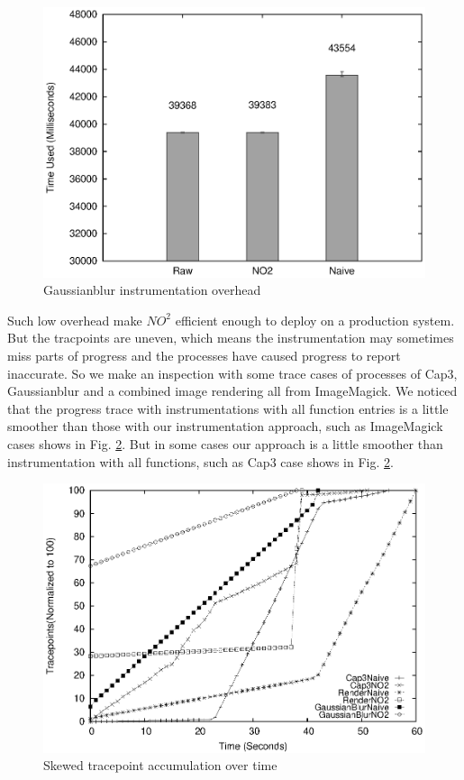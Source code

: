 \begin{figure}
\centering
  \includegraphics[width=0.9\columnwidth]{figures/overhead_gaussianblur.eps}
\caption{Gaussianblur instrumentation overhead}
\label{figure:overhead_gaussianblur}
\end{figure}

Such low overhead make $NO^2$ efficient enough to deploy on a production system. But
the tracpoints are uneven, which means the instrumentation may sometimes miss parts of progress and
the processes have caused progress to report inaccurate. So we make an inspection
with some trace cases of processes of Cap3, Gaussianblur and a combined image rendering
all from ImageMagick. We noticed that the progress trace with instrumentations with all
function entries is a little smoother than those with our instrumentation approach, such
as ImageMagick cases shows in Fig. \ref{figure:tracepoints}. But in some cases our
approach is a little smoother than instrumentation with all functions, such as Cap3 case
shows in Fig. \ref{figure:tracepoints}.

\begin{figure}
\centering
\includegraphics[width=0.9\columnwidth]{figures/tracepoints_all_vs_sampling.eps}
\caption{Skewed tracepoint accumulation over time}
\label{figure:tracepoints}
\end{figure}

